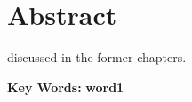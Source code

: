  \chapter*{Abstract}
 \vspace{0.5cm}

 discussed in the former chapters.

 {\bf Key Words: }{\bf word1}

